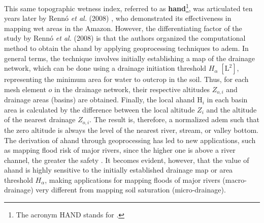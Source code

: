\documentclass[./main_en.tex]{subfiles}
\begin{document}
\par This same topographic wetness index, referred to as \textbf{\gls{hand}}\footnote{The acronym HAND stands for .}, was articulated ten years later by Rennó \textit{et al.} (2008) \cite{Renno2008a}, who demonstrated its effectiveness in mapping wet areas in the Amazon. However, the differentiating factor of the study by Rennó \textit{et al.} (2008) is that the authors organized the computational method to obtain the \acrshort{ahand} by applying geoprocessing techniques to \acrshort{adem}. In general terms, the technique involves initially establishing a map of the drainage network, which can be done using a drainage initiation threshold $H_{\alpha}\;[\text{L}^2]$, representing the minimum area for water to outcrop in the soil. Thus, for each mesh element $o$ in the drainage network, their respective altitudes $Z_{o, i}$ and drainage areas (basins) are obtained. Finally, the local \acrshort{ahand} $\text{H}_i$ in each basin area is calculated by the difference between the local altitude $Z_{i}$ and the altitude of the nearest drainage $Z_{o, i}$. The result is, therefore, a normalized \acrlong{adem} such that the zero altitude is always the level of the nearest river, stream, or valley bottom. The derivation of \acrshort{ahand} through geoprocessing has led to new applications, such as mapping flood risk of major rivers, since the higher one is above a river channel, the greater the safety \cite{Nobre2016a}. It becomes evident, however, that the value of \acrshort{ahand} is highly sensitive to the initially established drainage map or area threshold $H_{\alpha}$, making applications for mapping floods of major rivers (macro-drainage) very different from mapping soil saturation (micro-drainage).
\end{document}
